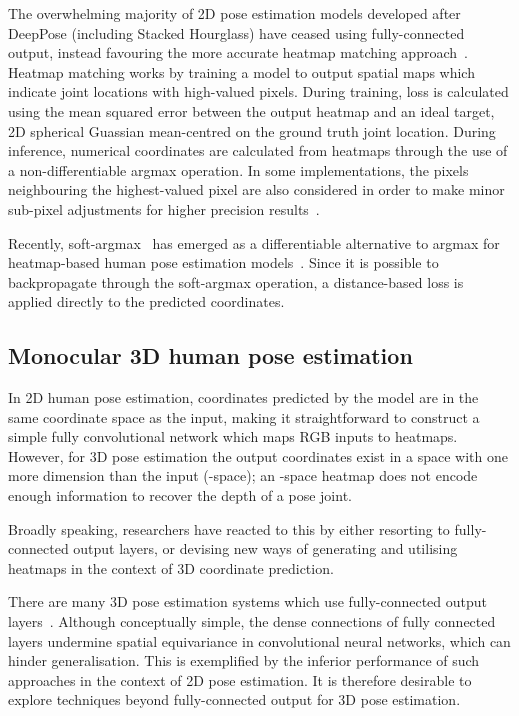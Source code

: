 \documentclass[australian,10pt,twocolumn,letterpaper,twocolumn]{article}
\makeatletter
\renewcommand{\paragraph}{\@startsection{paragraph}{4}{\z@}{0.7ex \@plus 0.2ex \@minus 0.2ex}{-1em}{\normalfont\normalsize\bfseries}}
\makeatother
\begin{document}
The overwhelming majority of 2D pose estimation models developed after
DeepPose (including Stacked Hourglass) have ceased using fully-connected
output, instead favouring the more accurate heatmap matching approach~\citep{tompson2014joint}.
Heatmap matching works by training a model to output spatial maps
which indicate joint locations with high-valued pixels. During training,
loss is calculated using the mean squared error between the output
heatmap and an ideal target, 2D spherical Guassian mean-centred on
the ground truth joint location. During inference, numerical coordinates
are calculated from heatmaps through the use of a non-differentiable
argmax operation. In some implementations, the pixels neighbouring
the highest-valued pixel are also considered in order to make minor
sub-pixel adjustments for higher precision results~\citep{newell2016stacked}.

Recently, soft-argmax~\citep{chapelle2010gradient,yi2016lift} has
emerged as a differentiable alternative to argmax for heatmap-based
human pose estimation models~\citep{luvizon2017human}. Since it
is possible to backpropagate through the soft-argmax operation, a
distance-based loss is applied directly to the predicted coordinates.

\subsection{Monocular 3D human pose estimation}

In 2D human pose estimation, coordinates predicted by the model are
in the same  coordinate space as the input, making it straightforward
to construct a simple fully convolutional network which maps RGB inputs
to  heatmaps. However, for 3D pose estimation the output coordinates
exist in a space with one more dimension than the input (-space);
an -space heatmap does not encode enough information to recover
the depth of a pose joint.

Broadly speaking, researchers have reacted to this by either resorting
to fully-connected output layers, or devising new ways of generating
and utilising heatmaps in the context of 3D coordinate prediction.

\paragraph{Fully-connected output.}

\noindent There are many 3D pose estimation systems which use fully-connected
output layers~\citep{lin2017recurrent,martinez2017simple,tekin2017learning}.
Although conceptually simple, the dense connections of fully connected
layers undermine spatial equivariance in convolutional neural networks,
which can hinder generalisation. This is exemplified by the inferior
performance of such approaches in the context of 2D pose estimation.
It is therefore desirable to explore techniques beyond fully-connected
output for 3D pose estimation.
\end{document}
